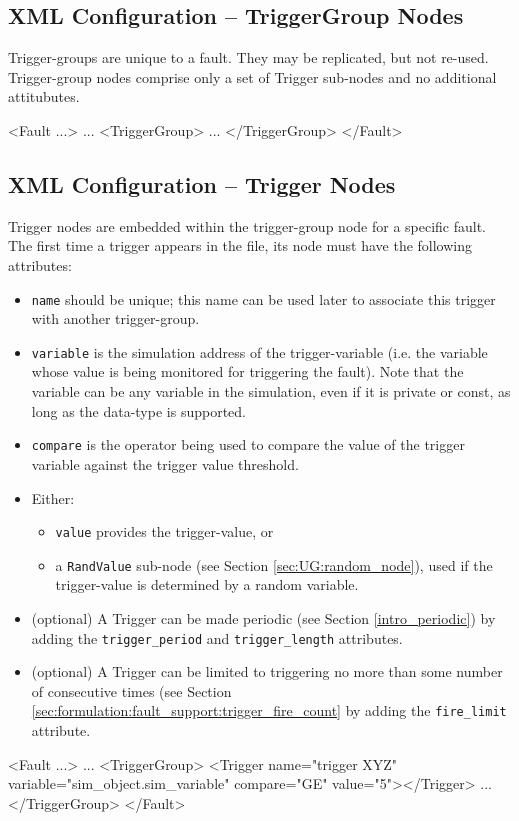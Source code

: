 \documentclass[11pt,fleqn]{report}
\begin{document}
\subsection {XML Configuration -- TriggerGroup Nodes}
Trigger-groups are unique to a fault. They may be replicated, but not re-used.
Trigger-group nodes comprise only a set of Trigger sub-nodes and no additional
attitubutes.
\begin{codeXML}
<Fault ...>
  ...
  <TriggerGroup>
    ...
  </TriggerGroup>
</Fault>
\end{codeXML}

\subsection {XML Configuration -- Trigger Nodes}
Trigger nodes are embedded within the trigger-group node for a specific fault.
The first time a trigger appears in the file, its node must have the following
attributes:
\begin{itemize}
 \item \verb"name" should be unique; this name can be used later to associate
   this trigger with another trigger-group.
 \item \verb"variable" is the simulation address of the trigger-variable (i.e.
   the variable whose value is being monitored for triggering the fault). Note
   that the variable can be any variable in the simulation, even if it is
   private or const, as long as the data-type is supported.
 \item \verb"compare" is the operator being used to compare the value of the
   trigger variable against the trigger value threshold.
 \item Either:
 \begin{itemize}
  \item \verb"value" provides the trigger-value, or
  \item a \verb"RandValue" sub-node (see Section \ref{sec:UG:random_node}), used
    if the trigger-value is determined by a random variable.
 \end{itemize}
 \item (optional) A Trigger can be made periodic (see Section
   \ref{intro_periodic}) by adding the
   \verb'trigger_period' and \verb'trigger_length' attributes.
 \item (optional) A Trigger can be limited to triggering no more than some
   number of consecutive times (see Section
   \ref{sec:formulation:fault_support:trigger_fire_count}
   by adding the
   \verb'fire_limit' attribute.
\end{itemize}
\begin{codeXML}
<Fault ...>
  ...
  <TriggerGroup>
    <Trigger name="trigger XYZ" variable="sim_object.sim_variable"
      compare="GE" value="5"></Trigger>
    ...
  </TriggerGroup>
</Fault>
\end{codeXML}
\end{document}
